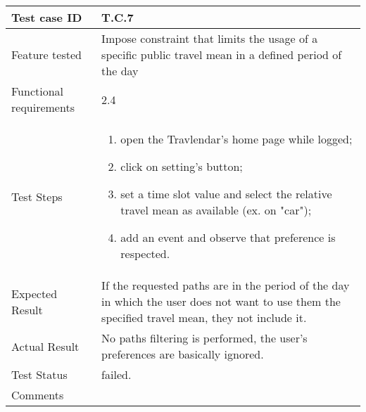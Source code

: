 \begin{table}[H]
	\begin{center}
		\begin{tabular}{ | p{} | p{} | }
		\hline
		Test case ID & T.C.7\\
		\hline
		Feature tested & Impose constraint that limits the usage of a specific public travel mean in a defined period of the day\\
		\hline
		Functional requirements & 2.4  \\
		\hline
		Test Steps & 
			\begin{enumerate}
				\item open the Travlendar's home page while logged;
				\item click on setting's button;
				\item set a time slot value and select the relative travel mean as available (ex. on "car");
				\item add an event and observe that preference is respected.
			\end{enumerate} \\
		\hline
		Expected Result & If the requested paths are in the period of the day in which the user does not want to use them the specified travel mean, they not include it.\\
		\hline
		Actual Result & No paths filtering is performed, the user's preferences are basically ignored.\\ 
		\hline
		Test Status & \color{Red}failed.\\ 
		\hline
		Comments &\\ 
		\hline
		\end{tabular}
	\end{center}
\end{table}

